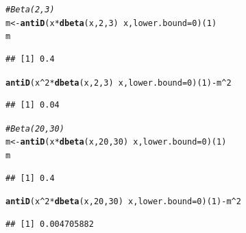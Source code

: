 \documentclass[twoside]{book}\usepackage[]{graphicx}\usepackage[]{xcolor}
\makeatletter
\newcommand{\hlnum}[1]{\textcolor[rgb]{0.686,0.059,0.569}{#1}}%
\newcommand{\hlcom}[1]{\textcolor[rgb]{0.678,0.584,0.686}{\textit{#1}}}%
\newcommand{\hlopt}[1]{\textcolor[rgb]{0,0,0}{#1}}%
\newcommand{\hlstd}[1]{\textcolor[rgb]{0.345,0.345,0.345}{#1}}%
\newcommand{\hlkwb}[1]{\textcolor[rgb]{0.69,0.353,0.396}{#1}}%
\newcommand{\hlkwc}[1]{\textcolor[rgb]{0.333,0.667,0.333}{#1}}%
\newcommand{\hlkwd}[1]{\textcolor[rgb]{0.737,0.353,0.396}{\textbf{#1}}}%
\newenvironment{kframe}{%
 \def\at@end@of@kframe{}%
 \ifinner\ifhmode%
  \def\at@end@of@kframe{\end{minipage}}%
  \begin{minipage}{\columnwidth}%
 \fi\fi%
 \def\FrameCommand##1{\hskip\@totalleftmargin \hskip-\fboxsep
 \colorbox{shadecolor}{##1}\hskip-\fboxsep
     \hskip-\linewidth \hskip-\@totalleftmargin \hskip\columnwidth}%
 \MakeFramed {\advance\hsize-\width
   \@totalleftmargin\z@ \linewidth\hsize
   \@setminipage}}%
 {\par\unskip\endMakeFramed%
 \at@end@of@kframe}
\newenvironment{knitrout}{}{} %
\makeatother
\begin{document}
\begin{solution}
\begin{knitrout}
\color{fgcolor}\begin{kframe}
\begin{alltt}
\hlcom{# Beta(2,3)}
\hlstd{m} \hlkwb{<-} \hlkwd{antiD}\hlstd{( x} \hlopt{*} \hlkwd{dbeta}\hlstd{(x,}\hlnum{2}\hlstd{,}\hlnum{3}\hlstd{)} \hlopt{~} \hlstd{x,} \hlkwc{lower.bound}\hlstd{=}\hlnum{0}\hlstd{)(}\hlnum{1}\hlstd{)}
\hlstd{m}
\end{alltt}
\begin{verbatim}
## [1] 0.4
\end{verbatim}
\begin{alltt}
\hlkwd{antiD}\hlstd{( x}\hlopt{^}\hlnum{2} \hlopt{*} \hlkwd{dbeta}\hlstd{(x,}\hlnum{2}\hlstd{,}\hlnum{3}\hlstd{)} \hlopt{~} \hlstd{x,} \hlkwc{lower.bound}\hlstd{=}\hlnum{0} \hlstd{)(}\hlnum{1}\hlstd{)} \hlopt{-} \hlstd{m}\hlopt{^}\hlnum{2}
\end{alltt}
\begin{verbatim}
## [1] 0.04
\end{verbatim}
\end{kframe}
\end{knitrout}
\begin{knitrout}
\color{fgcolor}\begin{kframe}
\begin{alltt}
\hlcom{# Beta(20,30)}
\hlstd{m} \hlkwb{<-} \hlkwd{antiD}\hlstd{( x} \hlopt{*} \hlkwd{dbeta}\hlstd{(x,}\hlnum{20}\hlstd{,}\hlnum{30}\hlstd{)} \hlopt{~} \hlstd{x,} \hlkwc{lower.bound}\hlstd{=}\hlnum{0}\hlstd{)(}\hlnum{1}\hlstd{)}
\hlstd{m}
\end{alltt}
\begin{verbatim}
## [1] 0.4
\end{verbatim}
\begin{alltt}
\hlkwd{antiD}\hlstd{( x}\hlopt{^}\hlnum{2} \hlopt{*} \hlkwd{dbeta}\hlstd{(x,}\hlnum{20}\hlstd{,}\hlnum{30}\hlstd{)} \hlopt{~} \hlstd{x,} \hlkwc{lower.bound}\hlstd{=}\hlnum{0} \hlstd{)(}\hlnum{1}\hlstd{)} \hlopt{-} \hlstd{m}\hlopt{^}\hlnum{2}
\end{alltt}
\begin{verbatim}
## [1] 0.004705882
\end{verbatim}
\end{kframe}
\end{knitrout}
\begin{knitrout}
\color{fgcolor}\begin{kframe}

\end{kframe}
\end{knitrout}
\end{solution}
\end{document}

